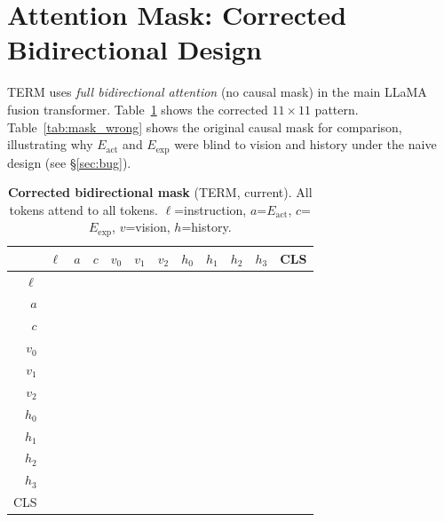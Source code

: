 \documentclass{article}
\newcommand{\cmark}{\ding{51}}
\begin{document}


\clearpage
\appendix

\section{Attention Mask: Corrected Bidirectional Design}
\label{app:mask}

TERM uses \emph{full bidirectional attention} (no causal mask) in the main
LLaMA fusion transformer.
Table~\ref{tab:mask_correct} shows the corrected $11\!\times\!11$ pattern.
Table~\ref{tab:mask_wrong} shows the original causal mask for comparison,
illustrating why $E_{\mathrm{act}}$ and $E_{\mathrm{exp}}$ were blind to
vision and history under the naive design (see \S\ref{sec:bug}).

\begin{table}[h]
\centering
\caption{\textbf{Corrected bidirectional mask} (TERM, current). All tokens attend to all tokens.
         $\ell$=instruction, $a$=$E_\mathrm{act}$, $c$=$E_\mathrm{exp}$, $v$=vision, $h$=history.}
\label{tab:mask_correct}
\scriptsize
\setlength{\tabcolsep}{3.5pt}
\begin{tabular}{r|ccccccccccc}
\toprule
 & $\ell$ & $a$ & $c$ & $v_0$ & $v_1$ & $v_2$ & $h_0$ & $h_1$ & $h_2$ & $h_3$ & CLS \\
\midrule
$\ell$ & \cmark&\cmark&\cmark&\cmark&\cmark&\cmark&\cmark&\cmark&\cmark&\cmark&\cmark \\
$a$    & \cmark&\cmark&\cmark&\cmark&\cmark&\cmark&\cmark&\cmark&\cmark&\cmark&\cmark \\
$c$    & \cmark&\cmark&\cmark&\cmark&\cmark&\cmark&\cmark&\cmark&\cmark&\cmark&\cmark \\
$v_0$  & \cmark&\cmark&\cmark&\cmark&\cmark&\cmark&\cmark&\cmark&\cmark&\cmark&\cmark \\
$v_1$  & \cmark&\cmark&\cmark&\cmark&\cmark&\cmark&\cmark&\cmark&\cmark&\cmark&\cmark \\
$v_2$  & \cmark&\cmark&\cmark&\cmark&\cmark&\cmark&\cmark&\cmark&\cmark&\cmark&\cmark \\
$h_0$  & \cmark&\cmark&\cmark&\cmark&\cmark&\cmark&\cmark&\cmark&\cmark&\cmark&\cmark \\
$h_1$  & \cmark&\cmark&\cmark&\cmark&\cmark&\cmark&\cmark&\cmark&\cmark&\cmark&\cmark \\
$h_2$  & \cmark&\cmark&\cmark&\cmark&\cmark&\cmark&\cmark&\cmark&\cmark&\cmark&\cmark \\
$h_3$  & \cmark&\cmark&\cmark&\cmark&\cmark&\cmark&\cmark&\cmark&\cmark&\cmark&\cmark \\
CLS    & \cmark&\cmark&\cmark&\cmark&\cmark&\cmark&\cmark&\cmark&\cmark&\cmark&\cmark \\
\bottomrule
\end{tabular}
\end{table}
\end{document}
